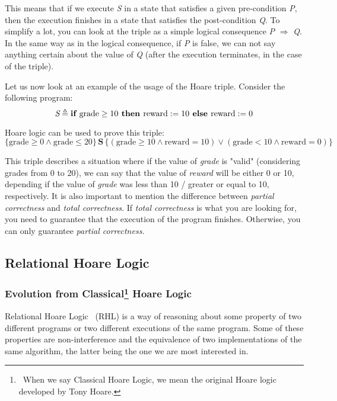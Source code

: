 This means that if we execute \emph{S} in a state that satisfies a given pre-condition \emph{P}, then the execution finishes in a state that satisfies the post-condition \emph{Q}.
To simplify a lot, you can look at the triple as a simple logical consequence \emph{P} $\Rightarrow$ \emph{Q}.
In the same way as in the logical consequence, if \emph{P} is false, we can not say anything certain about the value of \emph{Q} (after the execution terminates, in the case of the triple).

Let us now look at an example of the usage of the Hoare triple. Consider the following program:
\[ 
\emph{S} \triangleq \textbf{if } \text{grade} \geq 10 \textbf{ then } \text{reward} := 10 \textbf{ else } \text{reward} := 0 
\]

Hoare logic can be used to prove this triple:
\[
\{ \text{grade} \geq 0 \land \text{grade} \leq 20 \} \, \textbf{S} \, \{ (\text{grade} \geq 10 \land \text{reward} = 10) \lor (\text{grade} < 10 \land \text{reward} = 0) \}
\]

This triple describes a situation where if the value of \emph{grade} is "valid" (considering grades from 0 to 20), we can say that the value of \emph{reward} will be either 0 or 10, depending if the value of \emph{grade} was less than 10 / greater or equal to 10, respectively.
It is also important to mention the difference between \emph{partial correctness} and \emph{total correctness}.
If \emph{total correctness} is what you are looking for, you need to guarantee that the execution of the program finishes.
Otherwise, you can only guarantee \emph{partial correctness}.


\subsection{Relational Hoare Logic} 
\label{sub:relational_hoare_logic}

\subsubsection{Evolution from Classical\protect\footnote{\ When we say Classical Hoare Logic, we mean the original Hoare logic developed by Tony Hoare.} Hoare Logic}
\label{sub:relational_hoare_logic_motivation}

Relational Hoare Logic~\cite{naumann2022thirtysevenyearsrelationalhoare, DBLP:conf/popl/Benton04} (RHL) is a way of reasoning about some property of two different programs or two different executions of the same program.
Some of these properties are non-interference and the equivalence of two implementations of the same algorithm, the latter being the one we are most interested in.

